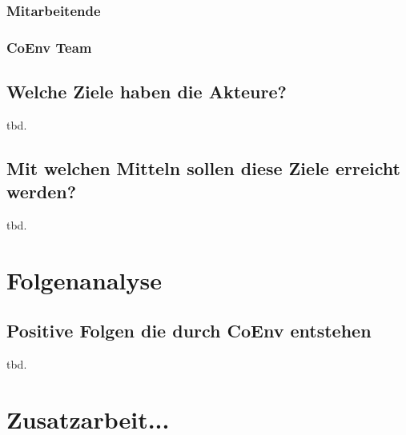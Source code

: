 \documentclass{article}
\begin{document}
\subsubsection{Mitarbeitende}
\subsubsection{CoEnv Team}

\subsection{Welche Ziele haben die Akteure?}

tbd.

\subsection{Mit welchen Mitteln sollen diese Ziele erreicht werden?}

tbd.

\section{Folgenanalyse}

\subsection{Positive Folgen die durch CoEnv entstehen}

tbd.

\section{Zusatzarbeit...}

% 
% 
\end{document}
